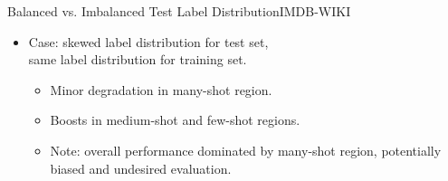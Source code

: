 \begin{frame}{Balanced vs. Imbalanced Test Label Distribution}{IMDB-WIKI}
\begin{itemize}
\begin{itemize}
		\end{itemize}
		\item Case: skewed label distribution for test set, 
		\\same label distribution for training set.
		\begin{itemize}
			\item Minor degradation in many-shot region.
			\item Boosts in medium-shot and few-shot regions.
			\item Note: overall performance dominated by many-shot region, potentially biased and undesired evaluation.
		\end{itemize}
	\end{itemize}
\end{frame}